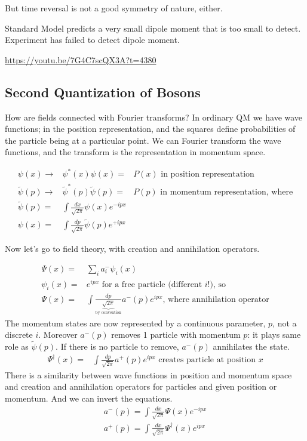 \documentclass[]{article}
\begin{document}
But time reversal is not a good symmetry of nature, either.

Standard Model predicts a very small dipole moment that is too small to detect. Experiment has failed to detect dipole moment.

\url{https://youtu.be/7G4C7scQX3A?t=4380}

\subsection{Second Quantization of Bosons}
 How are fields connected with Fourier transforms? In ordinary QM we have wave functions; in the position representation, and the squares define probabilities of the particle being at a particular point. We can Fourier transform the wave functions, and the transform is the representation in momentum space.


\begin{align*}
	\psi(x) \rightarrow& \psi^*(x)\psi(x)=&P(x) \text{ in position representation}\\
	\widetilde{\psi}(p) \rightarrow& \widetilde{\psi}^*(p) \widetilde{\psi}(p) =&P(p) \text{ in momentum representation, where}\\
	\widetilde{\psi}(p) =& \int \frac{dx}{\sqrt{2\pi}} \psi(x) e^{-i p x}\\
	\psi(x) =& \int \frac{dp}{\sqrt{2\pi}} \widetilde{\psi}(p) e^{+i p x}
\end{align*}

Now let's go to field theory, with creation and annihilation operators.

\begin{align*}
	\Psi(x) =& \sum_{i} a^-_i \psi_i(x)\\
	\psi_i(x) =& e^{ipx} \text{ for a free particle (different $i$!), so} \\
	\Psi(x)=& \int \frac{dp}{\underbrace{\sqrt{2\pi}}_\text{by convention}} a^-(p) e^{ipx} \text{, where annihilation operator}
\end{align*}
The momentum states are now represented by a continuous parameter, $p$, not a discrete $i$. Moreover $a^-(p)$  removes 1 particle with momentum $p$: it plays same role as $\widetilde{\psi}(p)$. If there is no particle to remove, $a^-(p)$ annihilates the state.
\begin{align*}
	\Psi^\dagger(x)=& \int \frac{dp}{\sqrt{2\pi}} a^+(p) e^{ipx} \text{ creates particle at position $x$}
\end{align*}
There is a similarity between wave functions in position and momentum space and creation and annihilation operators for particles and given position or momentum. And we can invert the equations.
\begin{align*}
	a^-(p) = \int \frac{dx}{\sqrt{2\pi}} \Psi(x) e^{-ipx}\\
	a^+(p) = \int \frac{dx}{\sqrt{2\pi}} \Psi^\dagger(x) e^{ipx}
\end{align*}
\end{document}
